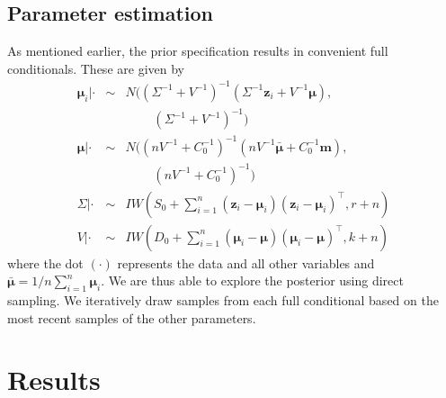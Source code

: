 \documentclass{asaproc}
\newcommand{\m}[1]{\mathbf{\bm{#1}}}
\begin{document}
\subsection{Parameter estimation}

As mentioned earlier, the prior specification results in convenient full conditionals. These are given by
\begin{eqnarray}
\m{\mu}_i|\cdot &\sim& N((\Sigma^{-1}+V^{-1})^{-1}(\Sigma^{-1}\m{z}_i+V^{-1}\m{\mu}), \nonumber \\
&& ~~~~~ ~~~~~ (\Sigma^{-1}+V^{-1})^{-1}) \\
\m{\mu}|\cdot &\sim& N((nV^{-1}+C_0^{-1})^{-1}(nV^{-1}\bar{\m{\mu}}+C_0^{-1}\m{m}), \nonumber \\
&& ~~~~~ ~~~~~ (nV^{-1}+C_0^{-1})^{-1}) \\
\Sigma|\cdot &\sim& IW(S_0+\sum_{i=1}^n(\m{z}_i-\m{\mu}_i)(\m{z}_i-\m{\mu}_i)^\top, r+n) \\
V|\cdot &\sim& IW(D_0+\sum_{i=1}^n(\m{\mu}_i-\m{\mu})(\m{\mu}_i-\m{\mu})^\top, k+n)
\end{eqnarray}
where the dot $(\cdot)$ represents the data and all other variables and $\bar{\m{\mu}}=1/n\sum_{i=1}^n\m{\mu}_i$. We are thus able to explore the posterior using direct sampling. We iteratively draw samples from each full conditional based on the most recent samples of the other parameters.

\section{Results}
\end{document}
